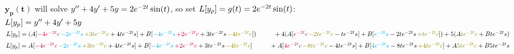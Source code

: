 \documentclass{article}
\begin{document}
\begin{enumerate}
$\bm{y_p(t)}$ will solve $y\sp{\prime\prime}+4y\sp{\prime}+5y=2e\sp{-2t}\sin(t)$, so set $L[y_p] = g(t) = 2e\sp{-2t}\sin(t)$:\\
$L[y_p] = y\sp{\prime\prime}+4y\sp{\prime}+5y$\\
$L[y_p] = (A[\textcolor{purple}{-4e\sp{-2t}c}\,\textcolor{cyan}{-2e\sp{-2t}s}\,\textcolor{olive}{+ 3te\sp{-2t}c} + 4te\sp{-2t}s ] + B[\textcolor{cyan}{-4e\sp{-2t}s}\,\textcolor{purple}{+2e\sp{-2t}c} + 3te\sp{-2t}s\,\textcolor{olive}{-4te\sp{-2t}c} ])\\ \phantom{0.0001}+4(A[\textcolor{purple}{e\sp{-2t}c} \,\textcolor{olive}{-2te\sp{-2t}c} - te\sp{-2t}s] + B[\textcolor{cyan}{e\sp{-2t}s} - 2te\sp{-2t}s\, \textcolor{olive}{+te\sp{-2t}c}])+5(A\textcolor{olive}{te\sp{-2t}c} + Bte\sp{-2t}s)$\\

$L[y_p] = A[\textcolor{purple}{-4e\sp{-2t}c}\,\textcolor{cyan}{-2e\sp{-2t}s}\,\textcolor{olive}{+ 3te\sp{-2t}c} + 4te\sp{-2t}s ] + B[\textcolor{cyan}{-4e\sp{-2t}s}\,\textcolor{purple}{+2e\sp{-2t}c} + 3te\sp{-2t}s\,\textcolor{olive}{-4te\sp{-2t}c} ]\\ \phantom{0.0001}+A[\textcolor{purple}{4e\sp{-2t}c} \,\textcolor{olive}{-8te\sp{-2t}c} - 4te\sp{-2t}s] + B[\textcolor{cyan}{4e\sp{-2t}s} - 8te\sp{-2t}s\, \textcolor{olive}{+4te\sp{-2t}c}]+A\textcolor{olive}{5te\sp{-2t}c} + B5te\sp{-2t}s$\\


\end{enumerate}
\end{document}

